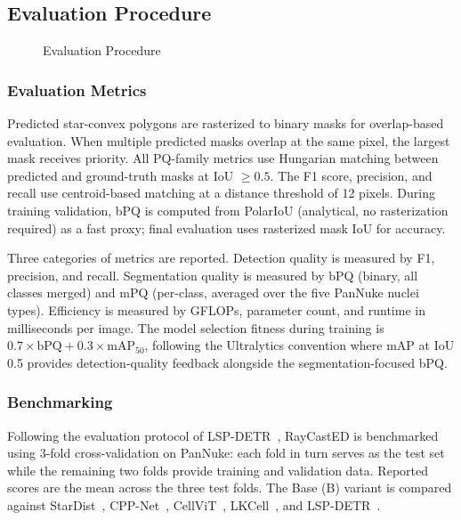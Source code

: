 


\subsection{Evaluation Procedure}
\begin{figure}[H]
	\centering
	\resizebox{0.95\textwidth}{!}{}
	\caption{Evaluation Procedure}
	\label{fig:evaluation}
\end{figure}

\subsubsection{Evaluation Metrics}

Predicted star-convex polygons are rasterized to binary masks for overlap-based evaluation. When multiple predicted masks overlap at the same pixel, the largest mask receives priority. All PQ-family metrics use Hungarian matching between predicted and ground-truth masks at IoU $\geq 0.5$. The F1 score, precision, and recall use centroid-based matching at a distance threshold of 12 pixels. During training validation, bPQ is computed from PolarIoU (analytical, no rasterization required) as a fast proxy; final evaluation uses rasterized mask IoU for accuracy.

Three categories of metrics are reported. Detection quality is measured by F1, precision, and recall. Segmentation quality is measured by bPQ (binary, all classes merged) and mPQ (per-class, averaged over the five PanNuke nuclei types). Efficiency is measured by GFLOPs, parameter count, and runtime in milliseconds per image. The model selection fitness during training is $0.7 \times \text{bPQ} + 0.3 \times \text{mAP}_{50}$, following the Ultralytics convention where mAP at IoU 0.5 provides detection-quality feedback alongside the segmentation-focused bPQ.

\subsubsection{Benchmarking}
\label{sec:benchmarking-protocol}

Following the evaluation protocol of LSP-DETR~\cite{pekar2026lspdetr}, RayCastED is benchmarked using 3-fold cross-validation on PanNuke: each fold in turn serves as the test set while the remaining two folds provide training and validation data. Reported scores are the mean across the three test folds. The Base (B) variant is compared against StarDist~\cite{schmidt2018cell}, CPP-Net~\cite{chen2023cppnet}, CellViT~\cite{horst2023cellvit}, LKCell~\cite{cui2024lkcell}, and LSP-DETR~\cite{pekar2026lspdetr}.

